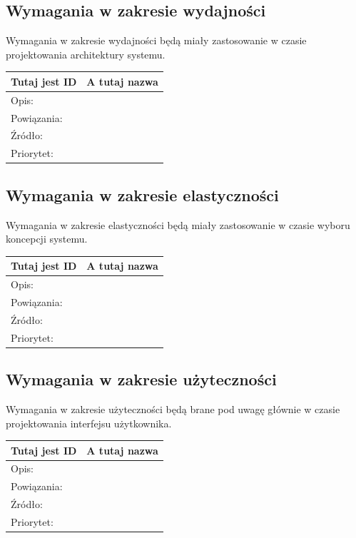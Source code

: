 \documentclass[a4paper,10pt]{article}
\begin{document}
\subsection{Wymagania w zakresie wydajności}

Wymagania w zakresie wydajności będą miały zastosowanie w czasie projektowania architektury systemu.


\begin{tabular}{|p{3cm}|p{9cm}|} \hline

Tutaj jest ID & A tutaj nazwa \\ \hline
Opis: &  \\ \hline
Powiązania: &  \\ \hline
Źródło: &  \\ \hline
Priorytet: &  \\ \hline

\end{tabular}


\subsection{Wymagania w zakresie elastyczności}

Wymagania w zakresie elastyczności będą miały zastosowanie w czasie wyboru koncepcji systemu.


\begin{tabular}{|p{3cm}|p{9cm}|} \hline

Tutaj jest ID & A tutaj nazwa \\ \hline
Opis: &  \\ \hline
Powiązania: &  \\ \hline
Źródło: &  \\ \hline
Priorytet: &  \\ \hline

\end{tabular}


\subsection{Wymagania w zakresie użyteczności}

Wymagania w zakresie użyteczności będą brane pod uwagę głównie w czasie projektowania interfejsu użytkownika.

\begin{tabular}{|p{3cm}|p{9cm}|} \hline

Tutaj jest ID & A tutaj nazwa \\ \hline
Opis: &  \\ \hline
Powiązania: &  \\ \hline
Źródło: &  \\ \hline
Priorytet: &  \\ \hline

\end{tabular}
\end{document}
